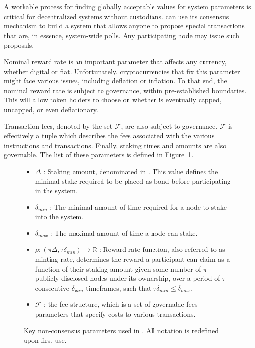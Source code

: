 \documentclass[runningheads]{llncs}
\begin{document}

A workable process for finding globally acceptable values for system parameters is critical for decentralized systems without custodians. 
\AVAPlatformName{} can use its consensus mechanism to build a system that allows anyone to propose special transactions that are, in essence, system-wide polls. 
Any participating node may issue such proposals. 

Nominal reward rate is an important parameter that affects any currency, whether digital or fiat. 
Unfortunately, cryptocurrencies that fix this parameter might face various issues, including deflation or inflation.
To that end, the nominal reward rate is subject to governance, within pre-established boundaries. This will allow token holders to choose on whether \AVATokenName{} is eventually capped, uncapped, or even deflationary. 

Transaction fees, denoted by the set $\mathcal{F}$, are also subject to governance. 
$\mathcal{F}$ is effectively a tuple which describes the fees associated with the various instructions and transactions. 
Finally, staking times and amounts are also governable. 
The list of these parameters is defined in Figure~\ref{fig:notation}.

\begin{figure}[hbtp]
\begin{framed}
\begin{itemize}
\item{$\Delta$} : Staking amount, denominated in \AVATokenName. This value defines the minimal stake required to be placed as bond before participating in the system.
\item{$\delta_{min}$} : The minimal amount of time required for a node to stake into the system.
\item{$\delta_{max}$} : The maximal amount of time a node can stake.
\item{$\rho: (\pi\Delta,\tau\delta_{min}) \rightarrow \mathbb{R}$} : Reward rate function, also referred to as minting rate, determines the reward a participant can claim as a function of their staking amount given some number of $\pi$ publicly disclosed nodes under its ownership, over a period of $\tau$ consecutive $\delta_{min}$ timeframes, such that $\tau\delta_{min} \leq \delta_{max}$. 
\item{$\mathcal{F}$} : the fee structure, which is a set of governable fees parameters that specify costs to various transactions.
\end{itemize}
\end{framed}
\caption{Key non-consensus parameters used in \AVAPlatformName{}. All notation is redefined upon first use.}
\label{fig:notation}
\end{figure}
\end{document}
